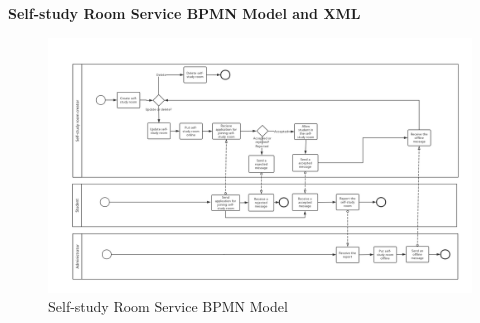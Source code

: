 \documentclass[runningheads]{llncs}
\begin{document}
    \textbf{Self-study Room Service BPMN Model and XML}\\
    \begin{figure}
        \centering %
        \includegraphics[width=1.0\textwidth]{figure/llt/bpmnselfstudy} %
       \caption{Self-study Room Service BPMN Model} %
        \label{Self-study Room} %
  	\end{figure}
\end{document}

